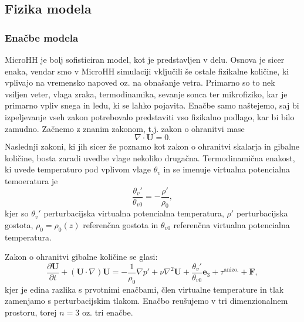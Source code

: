 \documentclass[mat2, tisk]{fmfdelo}
\begin{document}
\subsection{Fizika modela}
\subsubsection{Enačbe modela}
MicroHH je bolj sofisticiran model, kot je predstavljen v delu. Osnova je sicer enaka, vendar smo v MicroHH simulaciji vključili še ostale fizikalne količine, ki vplivajo na vremensko napoved oz. na obnašanje vetra. Primarno so to nek vsiljen veter, vlaga zraka, termodinamika, sevanje sonca ter mikrofiziko, kar je primarno vpliv snega in ledu, ki se lahko pojavita. Enačbe samo naštejemo, saj bi izpeljevanje vseh zakon potrebovalo predstaviti vso fizikalno podlago, kar bi bilo zamudno. Začnemo z znanim zakonom, t.j. zakon o ohranitvi mase 
$$
\nabla \cdot \textbf{U} = 0.
$$
Naslednji zakoni, ki jih sicer že poznamo kot zakon o ohranitvi skalarja in gibalne količine, bosta zaradi uvedbe vlage nekoliko drugačna. 
Termodinamična enakost, ki uvede temperaturo pod vplivom vlage 
$\theta_v$ in se imenuje virtualna potencialna temoeratura je 
\begin{equation}
\frac{\theta_v'}{\theta_{v0}} = - \frac{\rho'}{\rho_0},
\end{equation}
kjer so $\theta_v'$ perturbacijska virtualna potencialna temperatura, $\rho'$ perturbacijska gostota, $\rho_0 = \rho_0(z)$ referenčna gostota in $\theta_{v0}$ referenčna virtualna potencialna temperatura.

Zakon o ohranitvi gibalne količine se glasi:
\begin{equation}
\frac{\partial \textbf{U}}{\partial t} + (\textbf{U} \cdot \nabla)\textbf{U} = -\frac{1}{\rho_0}\nabla p' + \nu \nabla^2 \textbf{U} + \frac{\theta_v'}{\theta_{v0}} \textbf{e}_3 + \tau^{\text{anizo.}} + \textbf{F},
\end{equation}
kjer je edina razlika s prvotnimi enačbami, člen virtualne temperature
in tlak zamenjamo s perturbacijskim tlakom. Enačbo reušujemo v tri dimenzionalnem prostoru, 
torej $n=3$ oz. tri enačbe. 
\end{document}
